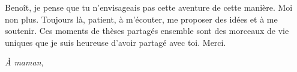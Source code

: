 Benoît, je pense que tu n'envisageais pas cette aventure de cette manière. Moi 
non plus. Toujours là, 
patient, à m'écouter, me proposer des idées et à me soutenir. Ces 
moments de thèses partagés ensemble sont des morceaux de vie uniques que je 
suis heureuse d'avoir partagé avec toi. Merci.
\clearpage
\pagebreak

\thispagestyle{empty}
\begin{flushright}
\textit{À maman,}
\end{flushright}

\pagebreak
